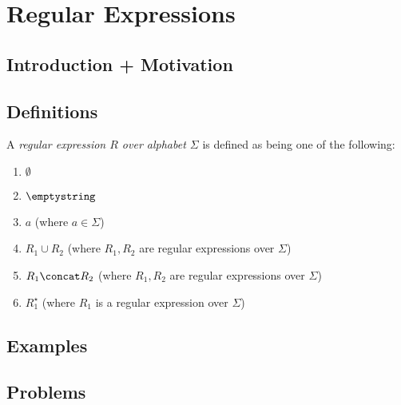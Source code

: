 \chapter{Regular Expressions}

\section{Introduction + Motivation}

\section{Definitions}

\begin{definition}
	A \textit{regular expression $R$ over alphabet $\Sigma$} is defined as being one of the following:
	\begin{enumerate}
		\item $\emptyset$ 
		\item $\emptystring$
		\item $a$ (where $a \in \Sigma$)
		\item $R_1 \cup R_2$ (where $R_1, R_2$ are regular expressions over $\Sigma$)
		\item $R_1 \concat R_2$ (where $R_1, R_2$ are regular expressions over $\Sigma$)
		\item $R_1^\star$ (where $R_1$ is a regular expression over $\Sigma$)
	\end{enumerate}
\end{definition}

\section{Examples}

\section{Problems}